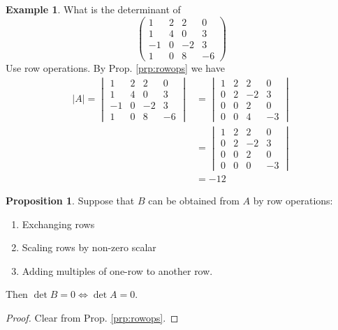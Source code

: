 \documentclass{article}
\theoremstyle{definition}
\newtheorem{proposition}[theorem]{Proposition}
\newtheorem*{exmp}{Example}
\begin{document}
\begin{exmp}
  What is the determinant of 
  \[
    \left(\begin{matrix}
      1 & 2 & 2 & 0 \\
      1 & 4 & 0 & 3 \\
      -1 & 0 & -2 & 3 \\
      1 & 0 & 8 & -6
    \end{matrix}\right)
  \]
  Use row operations. By Prop. \ref{prp:rowops} we have
\begin{align*}
    |A| =
    \begin{vmatrix}
      1 & 2 & 2 & 0 \\
      1 & 4 & 0 & 3 \\
      -1 & 0 & -2 & 3 \\
      1 & 0 & 8 & -6
    \end{vmatrix} &= 
    \begin{vmatrix}
      1 & 2 & 2 & 0 \\
      0 & 2 & -2 & 3 \\
      0 & 0 & 2 & 0 \\
      0 & 0 & 4 & -3
    \end{vmatrix}\\
    &=
    \begin{vmatrix}
      1 & 2 & 2 & 0 \\
      0 & 2 & -2 & 3 \\
      0 & 0 & 2 & 0 \\
      0 & 0 & 0 & -3 
    \end{vmatrix}\\
    &= -12
\end{align*}

\end{exmp}

\begin{proposition}
  Suppose that $B$ can be obtained from $A$ by row operations:
  \begin{enumerate}
    \item 
  Exchanging rows
    \item 
  Scaling rows by non-zero scalar
    \item 
  Adding multiples of one-row to another row.
  \end{enumerate}
  Then $\det B = 0 \iff \det A = 0$.
\end{proposition}

\begin{proof}
  Clear from Prop. \ref{prp:rowops}.
\end{proof}
\end{document}
